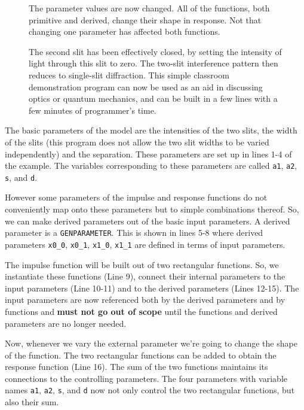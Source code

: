 \documentclass{report}
\begin{document}
\begin{figure}
\centerline{}
\caption{The parameter values are now changed.  All of the functions, both primitive
and derived, change their shape in response.  Not that changing one parameter has
affected both functions.}
\label{ref:PartiallyClosed}
\end{figure}

\begin{figure}
\centerline{}
\caption{The second slit has been effectively closed, by setting the intensity
of light through this slit to zero.  The two-slit interference pattern then
reduces to single-slit diffraction.  This simple classroom demonstration program 
can now be used as an aid in discussing optics or quantum mechanics, and can be
built in a few lines with a few minutes of programmer's time.}
\label{ref:TotallyClosed}
\end{figure}

\noindent The basic parameters of the model are the intensities of the two slits, the width
of the slits (this program does not allow the two slit widths to be varied independently)
and the separation.  These parameters are set up in lines 1-4 of the example.  The 
variables corresponding to these parameters are called \verb#a1#, \verb#a2#, \verb#s#, 
and \verb#d#.  

\noindent However some parameters of the impulse and response functions do not conveniently map
onto these parameters but to simple combinations thereof.  So, we can make derived parameters
out of the basic input parameters.  A derived parameter is a \verb#GENPARAMETER#.  This is
shown in lines 5-8 where derived parameters \verb#x0_0#, \verb#x0_1#, \verb#x1_0#, 
\verb#x1_1# are defined in terms of input parameters.

\noindent The impulse function will be built out of two rectangular functions.  So, we instantiate
these functions (Line 9), connect their internal parameters to the input parameters (Line 10-11)
and to the derived parameters (Lines 12-15).  The input parameters are now referenced both
by the derived parameters and by functions and {\bf must not go out of scope} until the
functions and derived parameters are no longer needed.

\noindent Now, whenever we vary the external parameter we're going to change the shape of the function.
The two rectangular functions can be added to obtain the response function (Line 16).  The sum of
the two functions maintains its connections to the controlling parameters.  The four parameters
with variable names  \verb#a1#, \verb#a2#, \verb#s#, and \verb#d# now not only control the 
two rectangular functions, but also their sum.
\end{document}
